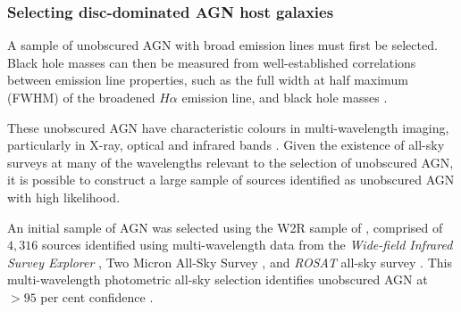 \subsubsection{Selecting disc-dominated AGN host galaxies}\label{sec:selectAGN}%

A sample of unobscured AGN with broad emission lines must first be selected. Black hole masses can then be measured from well-established correlations between emission line properties, such as the full width at half maximum (FWHM) of the broadened $H\alpha$ emission line, and black hole masses \citep[e.g.,][]{gh07a, jiang11a,xiao11, peterson14}. 

These unobscured AGN have characteristic colours in multi-wavelength imaging, particularly in X-ray, optical and infrared bands \citep{kauffmann03b, dstern05, goulding09, kauffmann09, aird12, mendez13, azadi16, cowley16, harrison16}. Given the existence of all-sky surveys at many of the wavelengths relevant to the selection of unobscured AGN, it is possible to construct a large sample of sources identified as unobscured AGN with high likelihood.

An initial sample of AGN was selected using the W2R sample of \citet{edelson12}, comprised of $4,316$ sources identified using multi-wavelength data from the \emph{Wide-field Infrared Survey Explorer} \citep[\emph{WISE};][]{wright10}, Two Micron All-Sky Survey \citep[2MASS;][]{skrutskie06}, and \emph{ROSAT} all-sky survey \citep[RASS;][]{voges99}. This multi-wavelength photometric all-sky selection identifies unobscured AGN at $>95$ per cent confidence \citep{edelson12}.


